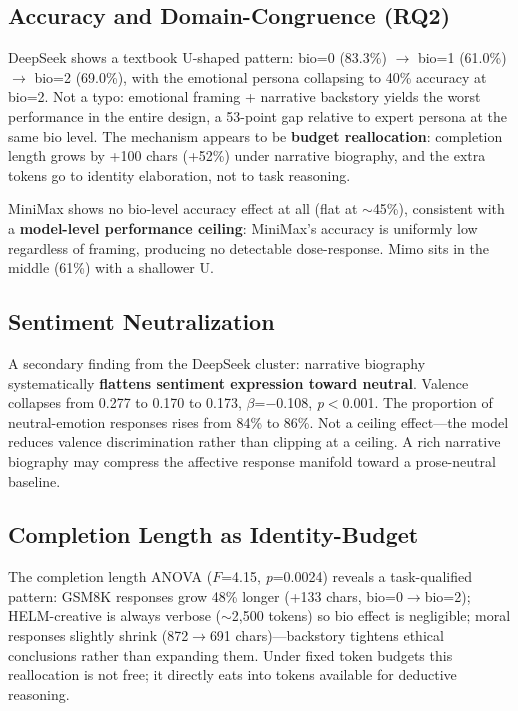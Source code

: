 \documentclass[11pt,a4paper]{article}
\begin{document}
\subsection{Accuracy and Domain-Congruence (RQ2)}

DeepSeek shows a textbook U-shaped pattern: bio=0 (83.3\%) $\rightarrow$ bio=1 (61.0\%) $\rightarrow$ bio=2 (69.0\%), with the emotional persona collapsing to 40\% accuracy at bio=2. Not a typo: emotional framing + narrative backstory yields the worst performance in the entire design, a 53-point gap relative to expert persona at the same bio level. The mechanism appears to be \textbf{budget reallocation}: completion length grows by +100 chars (+52\%) under narrative biography, and the extra tokens go to identity elaboration, not to task reasoning.

MiniMax shows no bio-level accuracy effect at all (flat at $\sim$45\%), consistent with a \textbf{model-level performance ceiling}: MiniMax's accuracy is uniformly low regardless of framing, producing no detectable dose-response. Mimo sits in the middle (61\%) with a shallower U.

\subsection{Sentiment Neutralization}

A secondary finding from the DeepSeek cluster: narrative biography systematically \textbf{flattens sentiment expression toward neutral}. Valence collapses from 0.277 to 0.170 to 0.173, $\beta$=$-$0.108, \textit{p}$<$0.001. The proportion of neutral-emotion responses rises from 84\% to 86\%. Not a ceiling effect---the model reduces valence discrimination rather than clipping at a ceiling. A rich narrative biography may compress the affective response manifold toward a prose-neutral baseline.

\subsection{Completion Length as Identity-Budget}

The completion length ANOVA ($F$=4.15, \textit{p}=0.0024) reveals a task-qualified pattern: GSM8K responses grow 48\% longer (+133 chars, bio=0$\rightarrow$bio=2); HELM-creative is always verbose ($\sim$2,500 tokens) so bio effect is negligible; moral responses slightly shrink (872$\rightarrow$691 chars)---backstory tightens ethical conclusions rather than expanding them. Under fixed token budgets this reallocation is not free; it directly eats into tokens available for deductive reasoning.
\end{document}
